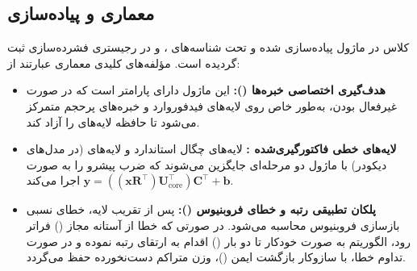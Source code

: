 \subsection{معماری و پیاده‌سازی}
کلاس  در ماژول  پیاده‌سازی شده و تحت شناسه‌های ،  و  در رجیستری فشرده‌سازی ثبت گردیده است. مؤلفه‌های کلیدی معماری عبارتند از:
\begin{itemize}
    \item \textbf{هدف‌گیری اختصاصی خبره‌ها ():} این ماژول دارای پارامتر  است که در صورت غیرفعال بودن، به‌طور خاص روی لایه‌های فیدفوروارد و خبره‌های پرحجم متمرکز می‌شود تا حافظه لایه‌های  را آزاد کند.
    \item \textbf{لایه‌های خطی فاکتورگیری‌شده :} لایه‌های چگال استاندارد و لایه‌های  (در مدل‌های دیکودر) با ماژول دو مرحله‌ای جایگزین می‌شوند که ضرب پیشرو را به صورت $\mathbf{y} = ((\mathbf{x} \mathbf{R}^\top) \mathbf{U}_{\text{core}}^\top) \mathbf{C}^\top + \mathbf{b}$ اجرا می‌کند.
    \item \textbf{پلکان تطبیقی رتبه و خطای فروبنیوس ():} پس از تقریب لایه، خطای نسبی بازسازی فروبنیوس محاسبه می‌شود. در صورتی که خطا از آستانه مجاز () فراتر رود، الگوریتم به صورت خودکار تا دو بار () اقدام به ارتقای رتبه نموده و در صورت تداوم خطا، با سازوکار بازگشت ایمن ()، وزن متراکم دست‌نخورده حفظ می‌گردد.
\end{itemize}
